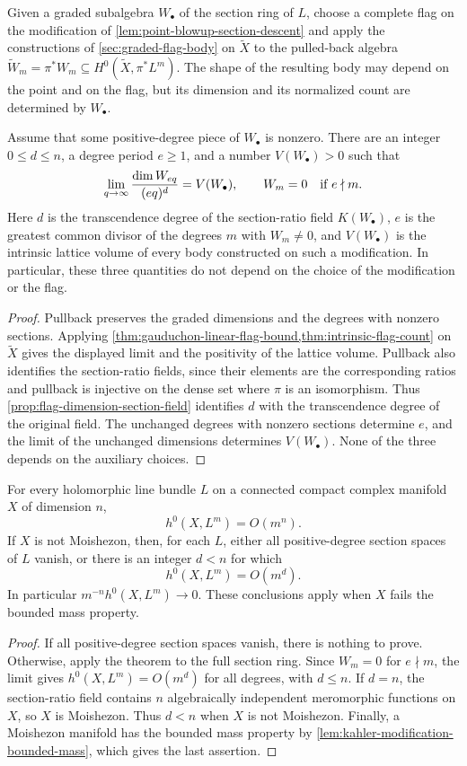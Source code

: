 Given a graded subalgebra $W_\bullet$ of the section ring of $L$, choose a complete flag on the modification of \cref{lem:point-blowup-section-descent} and apply the constructions of \cref{sec:graded-flag-body} on $\widetilde X$ to the pulled-back algebra $\widetilde W_m=\pi^*W_m\subseteq H^0(\widetilde X,\pi^*L^m)$. The shape of the resulting body may depend on the point and on the flag, but its dimension and its normalized count are determined by $W_\bullet$.

\begin{theorem}\label{thm:all-compact-section-count}
Assume that some positive-degree piece of $W_\bullet$ is nonzero. There are an integer $0\leq d\leq n$, a degree period $e\geq1$, and a number $V(W_\bullet)>0$ such that
\[
 \lim_{q\to\infty}\frac{\dim W_{eq}}{(eq)^d}=V(W_\bullet),
 \qquad W_m=0\quad\hbox{if }e\nmid m.
\]
Here $d$ is the transcendence degree of the section-ratio field $K(W_\bullet)$, $e$ is the greatest common divisor of the degrees $m$ with $W_m\neq0$, and $V(W_\bullet)$ is the intrinsic lattice volume of every body constructed on such a modification. In particular, these three quantities do not depend on the choice of the modification or the flag.
\end{theorem}
\begin{proof}
Pullback preserves the graded dimensions and the degrees with nonzero sections. Applying \cref{thm:gauduchon-linear-flag-bound,thm:intrinsic-flag-count} on $\widetilde X$ gives the displayed limit and the positivity of the lattice volume. Pullback also identifies the section-ratio fields, since their elements are the corresponding ratios and pullback is injective on the dense set where $\pi$ is an isomorphism. Thus \cref{prop:flag-dimension-section-field} identifies $d$ with the transcendence degree of the original field. The unchanged degrees with nonzero sections determine $e$, and the limit of the unchanged dimensions determines $V(W_\bullet)$. None of the three depends on the auxiliary choices.
\end{proof}

\begin{corollary}\label{cor:non-moishezon-section-vanishing}
For every holomorphic line bundle $L$ on a connected compact complex manifold $X$ of dimension $n$,
\[
 h^0(X,L^m)=O(m^n).
\]
If $X$ is not Moishezon, then, for each $L$, either all positive-degree section spaces of $L$ vanish, or there is an integer $d<n$ for which
\[
 h^0(X,L^m)=O(m^d).
\]
In particular $m^{-n}h^0(X,L^m)\to0$. These conclusions apply when $X$ fails the bounded mass property.
\end{corollary}
\begin{proof}
If all positive-degree section spaces vanish, there is nothing to prove. Otherwise, apply the theorem to the full section ring. Since $W_m=0$ for $e\nmid m$, the limit gives $h^0(X,L^m)=O(m^d)$ for all degrees, with $d\leq n$. If $d=n$, the section-ratio field contains $n$ algebraically independent meromorphic functions on $X$, so $X$ is Moishezon. Thus $d<n$ when $X$ is not Moishezon. Finally, a Moishezon manifold has the bounded mass property by \cref{lem:kahler-modification-bounded-mass}, which gives the last assertion.
\end{proof}

